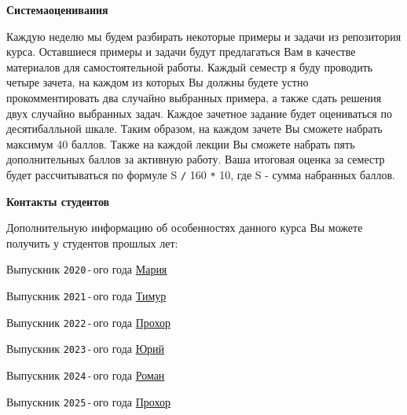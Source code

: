 \documentclass[a4paper,12pt]{article}
\renewenvironment{itemize}
{
    \begin{list}{\labelitemi}
    {
      \setlength{\topsep}{0pt}
      \setlength{\partopsep}{0pt}
      \setlength{\parskip}{0pt}
      \setlength{\itemsep}{0pt}
      \setlength{\parsep}{0pt}
      \setlength{\leftmargin}{14.5pt}
    }
}{\end{list}}
\begin{document}
\medskip
\medskip

\textbf{Система\:оценивания}

\medskip

Каждую неделю мы будем разбирать некоторые примеры и задачи из репозитория курса. Оставшиеся примеры и задачи будут предлагаться Вам в качестве материалов для самостоятельной работы. Каждый семестр я буду проводить четыре зачета, на каждом из которых Вы должны будете устно прокомментировать два случайно выбранных примера, а также сдать решения двух случайно выбранных задач. Каждое зачетное задание будет оцениваться по десятибалльной шкале. Таким образом, на каждом зачете Вы сможете набрать максимум 40 баллов. Также на каждой лекции Вы сможете набрать пять дополнительных баллов за активную работу. Ваша итоговая оценка за семестр будет рассчитываться по формуле S \texttt{/} 160 \texttt{*} 10, где S - сумма набранных баллов.

\medskip
\medskip

\textbf{Контакты студентов}

\medskip

Дополнительную информацию об особенностях данного курса Вы можете получить у студентов прошлых лет:

\medskip

\begin{itemize}

    \item Выпускник \texttt{2020}\,-\,ого года \href{https://t.me/makovka2000}{Мария}

    \smallskip

    \item Выпускник \texttt{2021}\,-\,ого года \href{https://t.me/TF0801}{Тимур}

    \smallskip

    \item Выпускник \texttt{2022}\,-\,ого года \href{https://t.me/Funny_ded}{Прохор}

    \smallskip

    \item Выпускник \texttt{2023}\,-\,ого года \href{https://t.me/YuriKashpur}{Юрий}

    \smallskip

    \item Выпускник \texttt{2024}\,-\,ого года \href{https://t.me/Yeah_That_Fits}{Роман} 

    \smallskip

    \item Выпускник \texttt{2025}\,-\,ого года \href{https://t.me/Funny_ded}{Прохор}

\end{itemize}
\end{document}
